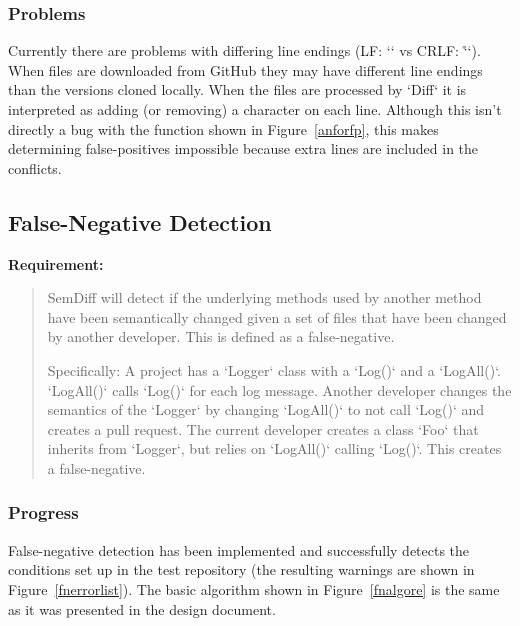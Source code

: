 \documentclass[draftclsnofoot,onecolumn]{IEEEtran}
\begin{document}
\subsubsection{Problems}

Currently there are problems with differing line endings (LF: `\n` vs CRLF: 
`\r\n`). When files are downloaded from GitHub they may have different line 
endings than the versions cloned locally. When the files are processed by 
`Diff` it is interpreted as adding (or removing) a character on each line. 
Although this isn’t directly a bug with the function shown in 
Figure~\ref{anforfp}, this makes determining false-positives impossible because 
extra lines are included in the conflicts.





\subsection{False-Negative Detection}%

\textbf{Requirement:}

\begin{quote}

SemDiff will detect if the underlying methods used by another method have been 
semantically changed given a set of files that have been changed by another 
developer. This is defined as a false-negative. 

Specifically: A project has a `Logger` class with a `Log()` and a `LogAll()`. 
`LogAll()` calls `Log()` for each log message. Another developer changes the 
semantics of the `Logger` by changing `LogAll()` to not call `Log()` and 
creates a pull request. The current developer creates a class `Foo` that 
inherits from `Logger`, but relies on `LogAll()` calling `Log()`. This creates 
a false-negative.

\end{quote}

\subsubsection{Progress}

False-negative detection has been implemented and successfully detects the 
conditions set up in the test repository (the resulting warnings are shown in 
Figure~\ref{fnerrorlist}). The basic algorithm shown in Figure~\ref{fnalgore} 
is the same as it was presented in the design document.
\end{document}
